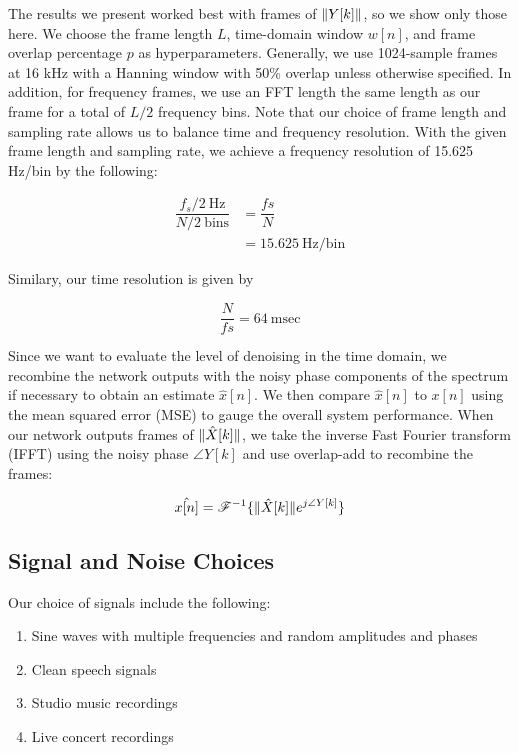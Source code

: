 The results we present worked best with frames of $\lVert Y[k]\rVert$, so we show only those here. We choose the frame length $L$, time-domain window $w[n]$, and frame overlap percentage $p$ as hyperparameters. Generally, we use 1024-sample frames at 16 kHz with a Hanning window with 50\% overlap unless otherwise specified. In addition, for frequency frames, we use an FFT length the same length as our frame for a total of $L/2$ frequency bins. Note that our choice of frame length and sampling rate allows us to balance time and frequency resolution. With the given frame length and sampling rate, we achieve a frequency resolution of 15.625 Hz/bin by the following:

\begin{align}
\dfrac{f_s/2 \:\text{Hz}}{N/2 \:\text{bins}} &= \dfrac{fs}{N}\\
&= 15.625 \:\text{Hz/bin}
\end{align}

Similary, our time resolution is given by

\begin{equation}
\dfrac{N}{fs} = 64 \:\text{msec}
\end{equation}

Since we want to evaluate the level of denoising in the time domain, we recombine the network outputs with the noisy phase components of the spectrum if necessary to obtain an estimate $\hat{x}[n]$. We then compare $\hat{x}[n]$ to $x[n]$ using the mean squared error (MSE) to gauge the overall system performance. When our network outputs frames of $\lVert\hat{X}[k]\rVert$, we take the inverse Fast Fourier transform (IFFT) using the noisy phase $\angle{Y[k]}$ and use overlap-add to recombine the frames:

\begin{equation}
\hat{x[n]} = \mathscr{F}^{-1} \{ \lVert\hat{X}[k]\rVert e^{j \angle{Y[k]}} \}
\end{equation}

\subsection{Signal and Noise Choices}
Our choice of signals include the following:

\begin{enumerate}
    \item Sine waves with multiple frequencies and random amplitudes and phases
    \item Clean speech signals
    \item Studio music recordings
    \item Live concert recordings
\end{enumerate}

